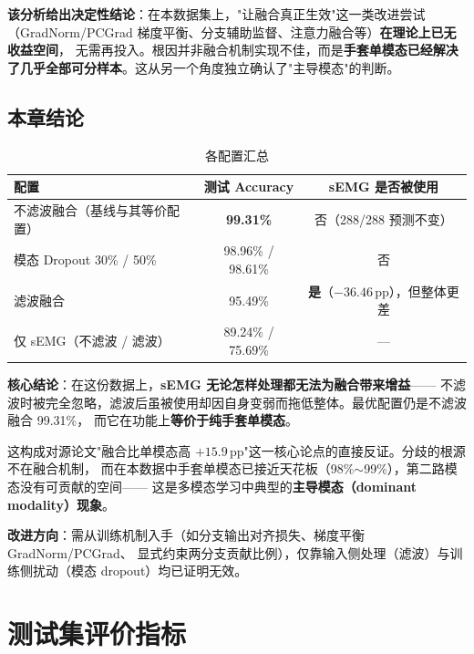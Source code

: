 \documentclass[11pt,a4paper]{ctexart}
\begin{document}
\begin{sloppypar}
\textbf{该分析给出决定性结论}：在本数据集上，"让融合真正生效"这一类改进尝试
（GradNorm/PCGrad 梯度平衡、分支辅助监督、注意力融合等）\textbf{在理论上已无收益空间}，
无需再投入。根因并非融合机制实现不佳，而是\textbf{手套单模态已经解决了几乎全部可分样本}。这从另一个角度独立确认了"主导模态"的判断。
\end{sloppypar}

\subsection{本章结论}

\begin{table}[htbp]\centering
\caption{各配置汇总}
\label{tab:suppsum}
\begin{tabular}{lcc}
\toprule
配置 & 测试 Accuracy & sEMG 是否被使用 \\
\midrule
不滤波融合（基线与其等价配置） & \textbf{99.31\%} & 否（288/288 预测不变） \\
模态 Dropout 30\% / 50\% & 98.96\% / 98.61\% & 否 \\
滤波融合 & 95.49\% & \textbf{是}（$-36.46$\,pp），但整体更差 \\
仅 sEMG（不滤波 / 滤波） & 89.24\% / 75.69\% & --- \\
\bottomrule
\end{tabular}
\end{table}

\textbf{核心结论}：在这份数据上，\textbf{sEMG 无论怎样处理都无法为融合带来增益}——
不滤波时被完全忽略，滤波后虽被使用却因自身变弱而拖低整体。最优配置仍是不滤波融合 99.31\%，
而它在功能上\textbf{等价于纯手套单模态}。

这构成对源论文"融合比单模态高 $+15.9$\,pp"这一核心论点的直接反证。分歧的根源不在融合机制，
而在本数据中手套单模态已接近天花板（98\%$\sim$99\%），第二路模态没有可贡献的空间——
这是多模态学习中典型的\textbf{主导模态（dominant modality）现象}。

\textbf{改进方向}：需从训练机制入手（如分支输出对齐损失、梯度平衡 GradNorm/PCGrad、
显式约束两分支贡献比例），仅靠输入侧处理（滤波）与训练侧扰动（模态 dropout）均已证明无效。



\section{测试集评价指标}
\end{document}
